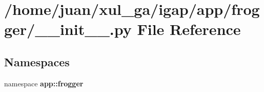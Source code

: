 \section{/home/juan/xul\_\-ga/igap/app/frogger/\_\-\_\-init\_\-\_\-.py File Reference}
\label{app_2frogger_2____init_____8py}
\subsection*{Namespaces}
\begin{CompactItemize}
\item 
namespace {\bf app::frogger}
\end{CompactItemize}
